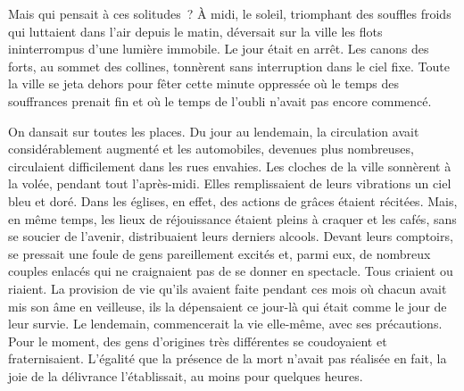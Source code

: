 \documentclass[french,twoside]{book} %
\begin{document}
Mais qui pensait à ces solitudes ? À midi, le soleil, triomphant des souffles froids qui luttaient dans l’air depuis le matin, déversait sur la ville les flots ininterrompus d’une lumière immobile. Le jour était en arrêt. Les canons des forts, au sommet des collines, tonnèrent sans interruption dans le ciel fixe. Toute la ville se jeta dehors pour fêter cette minute oppressée où le temps des souffrances prenait fin et où le temps de l’oubli n’avait pas encore commencé.\par
On dansait sur toutes les places. Du jour au lendemain, la circulation avait considérablement augmenté et les automobiles, devenues plus nombreuses, circulaient difficilement dans les rues envahies. Les cloches de la ville sonnèrent à la volée, pendant tout l’après-midi. Elles remplissaient de leurs vibrations un ciel bleu et doré. Dans les églises, en effet, des actions de grâces étaient récitées. Mais, en même temps, les lieux de réjouissance étaient pleins à craquer et les cafés, sans se soucier de l’avenir, distribuaient leurs derniers alcools. Devant leurs comptoirs, se pressait une foule de gens pareillement excités et, parmi eux, de nombreux couples enlacés qui ne craignaient pas de se donner en spectacle. Tous criaient ou riaient. La provision de vie qu’ils avaient faite pendant ces mois où chacun avait mis son âme en veilleuse, ils la dépensaient ce jour-là qui était comme le jour de leur survie. Le lendemain, commencerait la vie elle-même, avec ses précautions. Pour le moment, des gens d’origines très différentes se coudoyaient et fraternisaient. L’égalité que la présence de la mort n’avait pas réalisée en fait, la joie de la délivrance l’établissait, au moins pour quelques heures.\par
\end{document}
